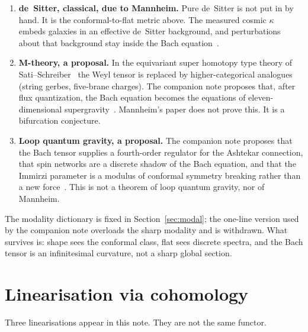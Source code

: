 \documentclass{article}
\theoremstyle{definition}
\begin{document}
\begin{enumerate}[label=\arabic*.]
  \item \textbf{de~Sitter, classical, due to Mannheim.}
        Pure de~Sitter is not put in by hand.  It is the conformal-to-flat
        metric above.  The measured cosmic \(\kappa\) embeds galaxies in an
        effective de~Sitter background, and perturbations about that
        background stay inside the Bach equation~\cite{Mannheim2011}.
  \item \textbf{M-theory, a proposal.}
        In the equivariant super homotopy type theory of
        Sati--Schreiber~\cite{sati2022anyonic,schreibershulman12cohesive} the
        Weyl tensor is replaced by higher-categorical analogues (string
        gerbes, five-brane charges).  The companion note proposes that, after
        flux quantization, the Bach equation becomes the equations of
        eleven-dimensional supergravity~\cite{TonpaConf}.  Mannheim's paper
        does not prove this.  It is a bifurcation conjecture.
  \item \textbf{Loop quantum gravity, a proposal.}
        The companion note proposes that the Bach tensor supplies a
        fourth-order regulator for the Ashtekar connection, that spin networks
        are a discrete shadow of the Bach equation, and that the Immirzi
        parameter is a modulus of conformal symmetry breaking rather than a
        new force~\cite{TonpaConf}.  This is not a theorem of loop quantum
        gravity, nor of Mannheim.
\end{enumerate}

The modality dictionary is fixed in Section~\ref{sec:modal}; the one-line
version used by the companion note overloads the sharp modality and is
withdrawn.  What survives is: shape sees the conformal class, flat sees
discrete spectra, and the Bach tensor is an infinitesimal curvature, not a
sharp global section.

\section{Linearisation via cohomology}

Three linearisations appear in this note.  They are not the same functor.
\end{document}
